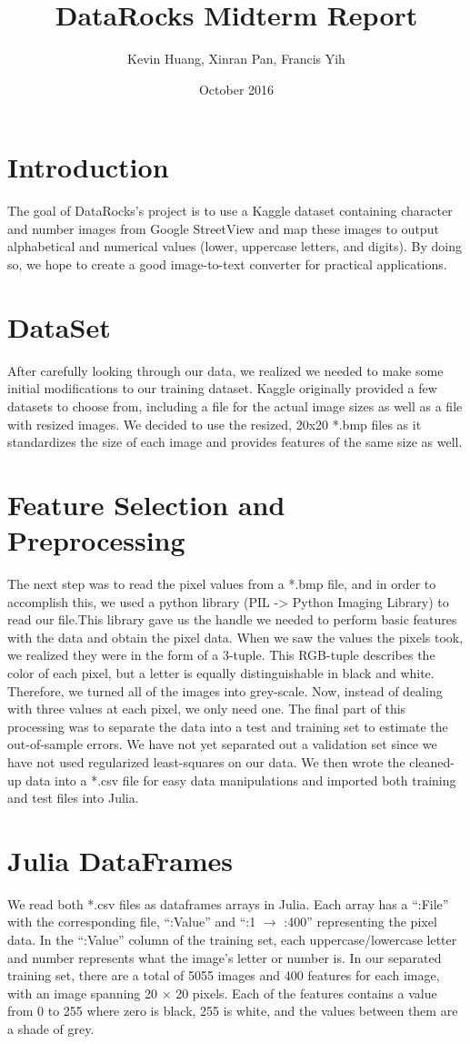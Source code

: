 \documentclass[twocolumn]{article}
\title{DataRocks Midterm Report}
\author{Kevin Huang, Xinran Pan, Francis Yih }
\date{October 2016}
\begin{document}
\maketitle

\section{Introduction}
	The goal of DataRocks’s project is to use a Kaggle dataset containing character and number images from Google StreetView and map these images to output alphabetical and numerical values (lower, uppercase letters, and digits). By doing so, we hope to create a good image-to-text converter for practical applications. 
\section{DataSet}
    After carefully looking through our data, we realized we needed to make some initial modifications to our training dataset. Kaggle originally provided a few datasets to choose from, including a file for the actual image sizes as well as a file with resized images. We decided to use the resized, 20x20 *.bmp files as it standardizes the size of each image and provides features of the same size as well. 
\section{Feature Selection and Preprocessing}
    The next step was to read the pixel values from a *.bmp file, and in order to accomplish this, we used a python library (PIL -> Python Imaging Library) to read our file.This library gave us the handle we needed to perform basic features with the data and obtain the pixel data. When we saw the values the pixels took, we realized they were in the form of a 3-tuple. This RGB-tuple describes the color of each pixel, but a letter is equally distinguishable in black and white. Therefore, we turned all of the images into grey-scale. Now, instead of dealing with three values at each pixel, we only need one. The final part of this processing was to separate the data into a test and training set to estimate the out-of-sample errors. We have not yet separated out a validation set since we have not used regularized least-squares on our data. We then wrote the cleaned-up data into a *.csv file for easy data manipulations and imported both training and test files into Julia. 

\section{Julia DataFrames}
    We read both *.csv files as dataframes arrays in Julia. Each array has a “:File” with the corresponding file, “:Value” and “:1 $\rightarrow$ :400” representing the pixel data. In the “:Value” column of the training set, each uppercase/lowercase letter and number represents what the image’s letter or number is. In our separated training set, there are a total of 5055 images and 400 features for each image, with an image spanning 20 $\times$ 20 pixels. Each of the features contains a value from 0 to 255 where zero is black, 255 is white, and the values between them are a shade of grey. 
\end{document}
